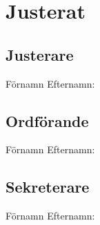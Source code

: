 \documentclass[a4paper,10pt]{article}	%
\begin{document}
\section{Justerat}
\subsection*{Justerare}
Förnamn Efternamn: \begin{flushright}\makebox[3in]{\hrulefill}\end{flushright}

\subsection*{Ordförande}
Förnamn Efternamn: \begin{flushright}\makebox[3in]{\hrulefill}\end{flushright}

\subsection*{Sekreterare}
Förnamn Efternamn: \begin{flushright}\makebox[3in]{\hrulefill}\end{flushright}
\end{document}
